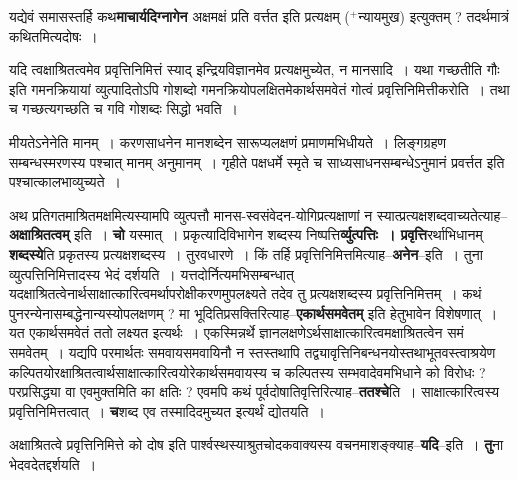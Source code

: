 \documentclass[article,12pt,a4paper]{memoir}
\newcommand{\add}[1]{($^{+}$#1)}
\begin{document}
	  \pstart यद्येवं समासस्तर्हि कथ\textbf{माचार्यदिग्नागेन} अक्षमक्षं प्रति वर्त्तत इति प्रत्यक्षम्  \add{न्यायमुख} इत्युक्तम् ? तदर्थमात्रं कथितमित्यदोषः ।
	\pend
	  \bigskip
	  \begingroup
	

	  \pstart यदि त्वक्षाश्रितत्वमेव प्रवृत्तिनिमित्तं स्याद् इन्द्रियविज्ञानमेव प्रत्यक्षमुच्येत, न मानसादि । यथा गच्छतीति गौः इति गमनक्रियायां व्युत्पादितोऽपि गोशब्दो गमनक्रियोपलक्षितमेकार्थसमवेतं गोत्वं प्रवृत्तिनिमित्तीकरोति । तथा च गच्छत्यगच्छति च गवि गोशब्दः सिद्धो भवति ।
	\pend
        

	  \pstart मीयतेऽनेनेति मानम् । करणसाधनेन मानशब्देन सारूप्यलक्षणं प्रमाणमभिधीयते । लिङ्गग्रहण सम्बन्धस्मरणस्य पश्चात् मानम् अनुमानम् । गृहीते पक्षधर्मे स्मृते च साध्यसाधनसम्बन्धेऽनुमानं प्रवर्त्तत इति पश्चात्कालभाव्युच्यते ।
	\pend
      
	  \endgroup
	

	  \pstart अथ प्रतिगतमाश्रितमक्षमित्यस्यामपि व्युत्पत्तौ मानस-स्वसंवेदन-योगिप्रत्यक्षाणां न स्यात्प्रत्यक्षशब्दवाच्यतेत्याह--\textbf{अक्षाश्रितत्वम्} इति । \textbf{चो} यस्मात् । प्रकृत्यादिविभागेन शब्दस्य निष्पत्ति\textbf{र्व्युत्पत्तिः । प्रवृत्ति}रर्थाभिधानम् \textbf{शब्दस्ये}ति प्रकृतस्य प्रत्यक्षशब्दस्य । तुरवधारणे । किं तर्हि प्रवृत्तिनिमित्तमित्याह--\textbf{अनेन}--इति । तुना व्युत्पत्तिनिमित्तादस्य भेदं द\leavevmode{}र्शयति । यत्तदोर्नित्यमभिसम्बन्धात् यदक्षाश्रितत्वेनार्थसाक्षात्कारित्वमर्थापरोक्षीकरणमुपलक्ष्यते तदेव तु प्रत्यक्षशब्दस्य प्रवृत्तिनिमित्तम् । कथं पुनरन्येनासम्बद्धेनान्यस्योपलक्षणम् ? मा भूदितिप्रसक्तिरित्याह--\textbf{एकार्थसमवेतम्} इति हेतुभावेन विशेषणात् । यत एकार्थसमवेतं ततो लक्ष्यत इत्यर्थः । एकस्मिन्नर्थे ज्ञानलक्षणेऽर्थसाक्षात्कारित्वमक्षाश्रितत्वेन समं समवेतम् । यद्यपि परमार्थतः समवायसमवायिनौ न स्तस्तथापि तद्व्यावृत्तिनिबन्धनयोस्तथाभूतवस्त्वाश्रयेण कल्पितयोरक्षाश्रितत्वार्थसाक्षात्कारित्वयोरेकार्थसमवायस्य च कल्पितस्य सम्भवादेवमभिधाने को विरोधः ? परप्रसिद्ध्या वा एवमुक्तमिति का क्षतिः ? एवमपि कथं पूर्वदोषातिवृत्तिरित्याह--\textbf{ततश्चे}ति । साक्षात्कारित्वस्य प्रवृत्तिनिमित्तत्वात् । \textbf{च}शब्द एव तस्मादिदमुच्यत इत्यर्थं द्योतयति ।
	\pend
      

	  \pstart अक्षाश्रितत्वे प्रवृत्तिनिमित्ते को दोष इति पार्श्वस्थस्याश्रुतचोदकवाक्यस्य वचनमाशङ्क्याह--\textbf{यदि}--इति । \textbf{तु}ना भेदवदेतद्दर्शयति ।
	\pend
      
\end{document}
